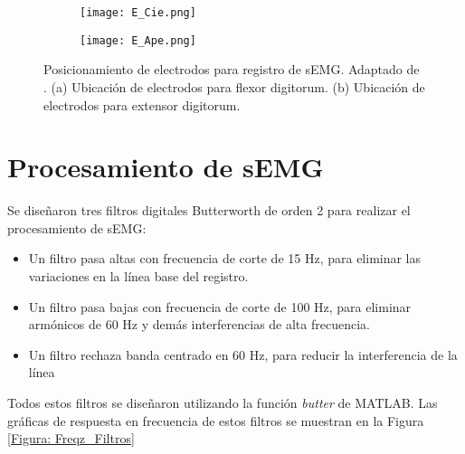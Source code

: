 \vfill
\begin{figure}[htbp]
	\centering
	\begin{subfigure}[htbp]{0.3\textwidth}
		\texttt{[image: E\_Cie.png]}
		\caption{}
		\label{Figura: E_Cie}
	\end{subfigure}
	\hspace{3cm}
	\begin{subfigure}[htbp]{0.3\textwidth}
		\texttt{[image: E\_Ape.png]}
		\caption{}
		\label{Figura: E_Ape}
	\end{subfigure}
	\caption[Posicionamiento de electrodos para registro de sEMG]{Posicionamiento de electrodos para registro de sEMG. Adaptado de \cite{Cavalcanti-Garcia2009}. (a) Ubicación de electrodos para flexor digitorum. (b) Ubicación de electrodos para extensor digitorum.}
	\label{Figura: E_sEMG}
\end{figure}
\vfill

\newpage
\section{Procesamiento de sEMG} \label{Sec: Procesamiento}
Se diseñaron tres filtros digitales Butterworth de orden 2 para realizar el procesamiento de sEMG:

\begin{itemize}
	\item Un filtro pasa altas con frecuencia de corte de 15 Hz, para eliminar las variaciones en la línea base del registro.
	\item Un filtro pasa bajas con frecuencia de corte de 100 Hz, para eliminar armónicos de 60 Hz y demás interferencias de alta frecuencia.
	\item Un filtro rechaza banda centrado en 60 Hz, para reducir la interferencia de la línea
\end{itemize}

Todos estos filtros se diseñaron utilizando la función \emph{butter} de MATLAB\textregistered. Las gráficas de respuesta en frecuencia de estos filtros se muestran en la Figura \ref{Figura: Freqz_Filtros} %

